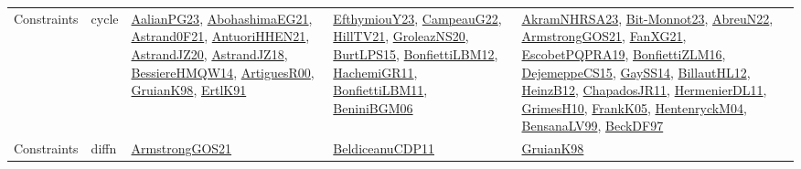{\begin{longtable}{lp{3cm}>{\raggedright}p{6cm}>{\raggedright}p{6cm}p{8cm}}
Constraints & cycle & \href{papers/AalianPG23.pdf}{AalianPG23}\cite{AalianPG23}, \href{articles/AbohashimaEG21.pdf}{AbohashimaEG21}\cite{AbohashimaEG21}, \href{papers/Astrand0F21.pdf}{Astrand0F21}\cite{Astrand0F21}, \href{papers/AntuoriHHEN21.pdf}{AntuoriHHEN21}\cite{AntuoriHHEN21}, \href{articles/AstrandJZ20.pdf}{AstrandJZ20}\cite{AstrandJZ20}, \href{papers/AstrandJZ18.pdf}{AstrandJZ18}\cite{AstrandJZ18}, \href{papers/BessiereHMQW14.pdf}{BessiereHMQW14}\cite{BessiereHMQW14}, \href{articles/ArtiguesR00.pdf}{ArtiguesR00}\cite{ArtiguesR00}, \href{papers/GruianK98.pdf}{GruianK98}\cite{GruianK98}, \href{papers/ErtlK91.pdf}{ErtlK91}\cite{ErtlK91} & \href{papers/EfthymiouY23.pdf}{EfthymiouY23}\cite{EfthymiouY23}, \href{articles/CampeauG22.pdf}{CampeauG22}\cite{CampeauG22}, \href{papers/HillTV21.pdf}{HillTV21}\cite{HillTV21}, \href{papers/GroleazNS20.pdf}{GroleazNS20}\cite{GroleazNS20}, \href{papers/BurtLPS15.pdf}{BurtLPS15}\cite{BurtLPS15}, \href{papers/BonfiettiLBM12.pdf}{BonfiettiLBM12}\cite{BonfiettiLBM12}, \href{articles/HachemiGR11.pdf}{HachemiGR11}\cite{HachemiGR11}, \href{papers/BonfiettiLBM11.pdf}{BonfiettiLBM11}\cite{BonfiettiLBM11}, \href{papers/BeniniBGM06.pdf}{BeniniBGM06}\cite{BeniniBGM06} & \href{articles/AkramNHRSA23.pdf}{AkramNHRSA23}\cite{AkramNHRSA23}, \href{papers/Bit-Monnot23.pdf}{Bit-Monnot23}\cite{Bit-Monnot23}, \href{articles/AbreuN22.pdf}{AbreuN22}\cite{AbreuN22}, \href{papers/ArmstrongGOS21.pdf}{ArmstrongGOS21}\cite{ArmstrongGOS21}, \href{articles/FanXG21.pdf}{FanXG21}\cite{FanXG21}, \href{articles/EscobetPQPRA19.pdf}{EscobetPQPRA19}\cite{EscobetPQPRA19}, \href{papers/BonfiettiZLM16.pdf}{BonfiettiZLM16}\cite{BonfiettiZLM16}, \href{papers/DejemeppeCS15.pdf}{DejemeppeCS15}\cite{DejemeppeCS15}, \href{papers/GaySS14.pdf}{GaySS14}\cite{GaySS14}, \href{papers/BillautHL12.pdf}{BillautHL12}\cite{BillautHL12}, \href{papers/HeinzB12.pdf}{HeinzB12}\cite{HeinzB12}, \href{papers/ChapadosJR11.pdf}{ChapadosJR11}\cite{ChapadosJR11}, \href{papers/HermenierDL11.pdf}{HermenierDL11}\cite{HermenierDL11}, \href{papers/GrimesH10.pdf}{GrimesH10}\cite{GrimesH10}, \href{papers/FrankK05.pdf}{FrankK05}\cite{FrankK05}, \href{papers/HentenryckM04.pdf}{HentenryckM04}\cite{HentenryckM04}, \href{articles/BensanaLV99.pdf}{BensanaLV99}\cite{BensanaLV99}, \href{papers/BeckDF97.pdf}{BeckDF97}\cite{BeckDF97}\\
Constraints & diffn & \href{papers/ArmstrongGOS21.pdf}{ArmstrongGOS21}\cite{ArmstrongGOS21} & \href{articles/BeldiceanuCDP11.pdf}{BeldiceanuCDP11}\cite{BeldiceanuCDP11} & \href{papers/GruianK98.pdf}{GruianK98}\cite{GruianK98}\\

\end{longtable}}
